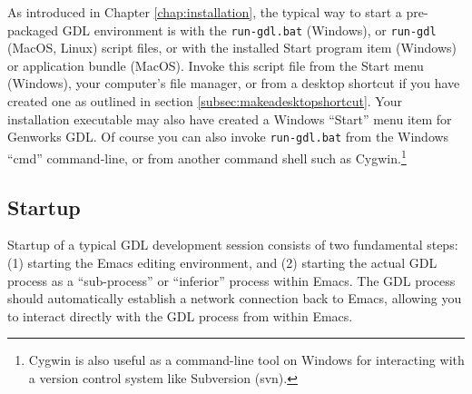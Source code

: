 \documentclass [11pt]{book}
\begin{document}
As introduced in Chapter 
\ref{chap:installation}, the typical way to start a pre-packaged GDL environment is with the \texttt{run-gdl.bat} (Windows), or \texttt{run-gdl} (MacOS, Linux) script files, or with the installed Start
program item (Windows) or application bundle (MacOS). Invoke this
script file from the Start menu (Windows), your computer's file
manager, or from a desktop shortcut if you have created one as
outlined in section 
\ref{subsec:makeadesktopshortcut}. Your installation executable may also have created a
Windows ``Start'' menu item for Genworks GDL. Of course you can also 
invoke \texttt{run-gdl.bat} from the Windows ``cmd'' command-line, or from another command shell such as Cygwin.\footnote{Cygwin is also useful as a command-line tool on Windows
for interacting with a version control system like Subversion (svn).}



\subsection{Startup}

\label{subsec:startup}

 Startup of a typical GDL development session consists of
two fundamental steps: (1) starting the Emacs editing environment,
and (2) starting the actual GDL process as a ``sub-process'' or ``inferior'' process 
within Emacs. The GDL process should automatically establish a network connection
back to Emacs, allowing you to interact directly with the GDL process from within Emacs.
\end{document}
